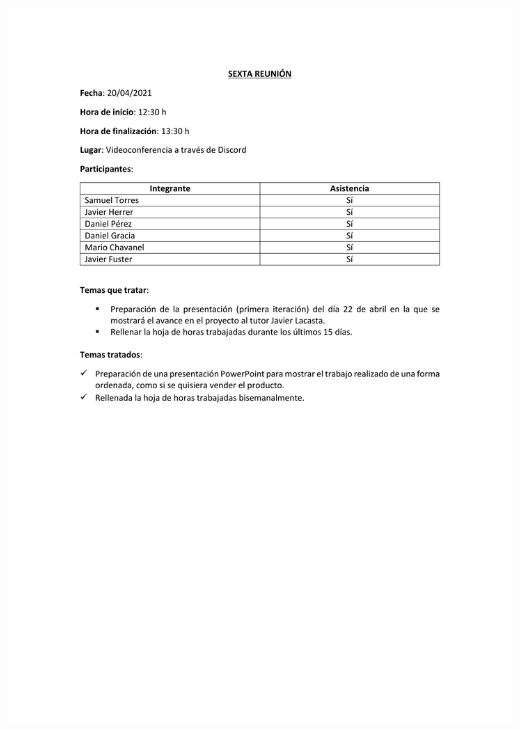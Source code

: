 \documentclass{article}
\begin{document}
\includegraphics[width=\textwidth]{../images/actas/Acta_reunion_6.pdf}
\end{document}
